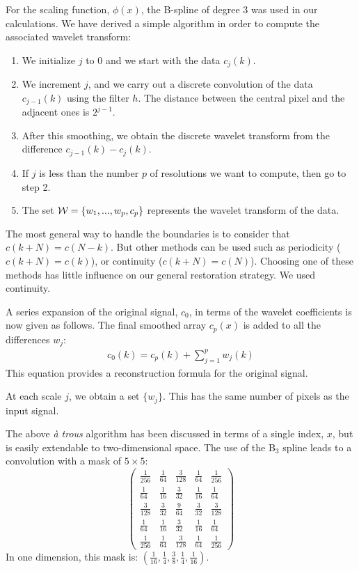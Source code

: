 \documentclass[11pt,a4paper]{article}
\begin{document}
For the scaling function, $\phi(x)$, the B-spline of degree 3 
was used in our calculations.     
We have derived a simple algorithm in order to compute the 
associated wavelet transform:
\begin{enumerate}
\item We initialize $j$ to 0 and we start with the data $c_j(k)$.
\item We increment $j$, and we carry out a discrete convolution of the data
$c_{j-1}(k)$ using  the filter $h$. The distance between the central pixel
and the adjacent ones is $2^{j-1}$.
\item After this smoothing, we obtain the discrete wavelet transform
from the difference $c_{j-1}(k) - c_j(k)$.
\item If $j$ is less than the number $p$ of resolutions we want to
compute, then go to step 2.
\item The set ${\cal W} = \{ w_1, ..., w_p, c_p \}$ represents the
wavelet transform of the data.
\end{enumerate}


The most general way to handle the boundaries is to consider
that $c(k + N) = c(N - k)$. But other methods can be used
such as periodicity ($c(k + N) = c(k)$), or continuity
 ($c(k + N) = c(N)$).  Choosing one of these methods has little influence 
on our general restoration strategy.  We used continuity.  
 
A series expansion of the original signal, $c_0$, 
in terms of
the wavelet coefficients is now given as follows. 
The final smoothed array $c_{p}(x)$ is added to all the differences $w_j$:
\begin{eqnarray}
c_0(k) = c_{p}(k) + \sum_{j=1}^{p} w_j(k)
\end{eqnarray}
 This equation provides a reconstruction formula for the original signal.
 
At each scale $j$, we obtain a set $\{w_j\}$.  This has 
the same number of pixels as the input signal. 

The above {\em \`a trous} algorithm has been discussed in terms of a single
index, $x$, but is easily extendable to 
two-dimensional space.  The use of the B$_3$ spline leads to a 
convolution with a mask of $5 \times 5$:
$$ 
\left(    \begin{array}{ccccc}
\frac{1}{256} & \frac{1}{64} & \frac{3}{128} & \frac{1}{64} & \frac{1}{256} \\
\frac{1}{64}  & \frac{1}{16} & \frac{3}{32}  & \frac{1}{16} & \frac{1}{64}  \\
\frac{3}{128} & \frac{3}{32} & \frac{9}{64}  & \frac{3}{32} & \frac{3}{128} \\
\frac{1}{64}  & \frac{1}{16} & \frac{3}{32}  & \frac{1}{16} & \frac{1}{64}  \\
\frac{1}{256} & \frac{1}{64} & \frac{3}{128} & \frac{1}{64} & \frac{1}{256} 
\end{array} \right)
$$
In one dimension, this mask is:
$ ( \frac{1}{16}, \frac{1}{4}, \frac{3}{8},
\frac{1}{4}, \frac{1}{16} ) $.
 
\end{document}
